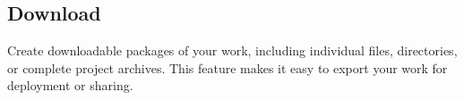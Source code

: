 \subsection*{Download}

Create downloadable packages of your work, including individual files, directories, or complete project archives. This feature makes it easy to export your work for deployment or sharing.